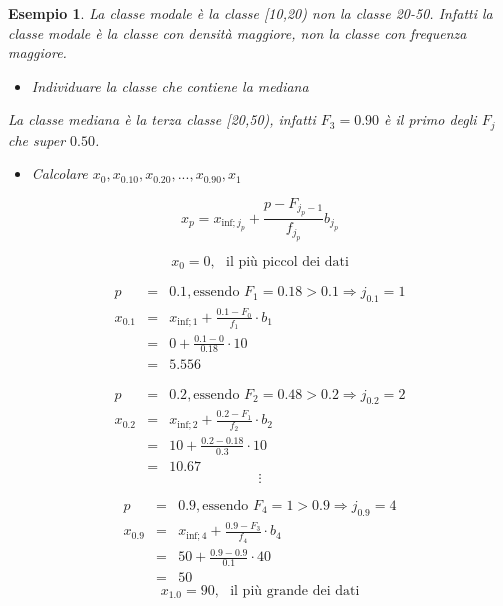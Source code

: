 \documentclass[
  11pt,
]{book}
\providecommand{\tightlist}{%
  \setlength{\itemsep}{0pt}\setlength{\parskip}{0pt}}
\theoremstyle{mytheoremstyle}
\theoremstyle{mydefstyle}
\newtheorem{example}{{Esempio}}[section]
\begin{document}
\begin{example}
La classe modale è la classe {[}10,20) non la classe 20-50. Infatti la classe modale è la classe con densità maggiore, non la classe con frequenza maggiore.

\begin{itemize}
\tightlist
\item
  Individuare la classe che contiene la mediana
\end{itemize}

La classe mediana è la terza classe {[}20,50), infatti \(F_3=0.90\) è il primo degli \(F_j\) che
super \(0.50\).

\begin{itemize}
\tightlist
\item
  Calcolare \(x_0, x_{0.10}, x_{0.20},..., x_{0.90}, x_1\)
\end{itemize}

\[x_p           = x_{\text{inf};j_p} + \frac {p - F_{j_p - 1}} {f_{j_p}} b_{j_p}\]

\[x_0 = 0, ~~~\text{il più piccol dei dati}\]

\begin{eqnarray*}
  p &=&  0.1 , \text{essendo }F_{ 1 }= 0.18  > 0.1  \Rightarrow j_{ 0.1 }= 1 \\
  x_{ 0.1 } &=& x_{\text{inf}; 1 } + \frac{ { 0.1 } - F_{ 0 }} {f_{ 1 }} \cdot b_{ 1 } \\
            &=&  0  + \frac {{ 0.1 } -  0 } { 0.18 } \cdot  10  \\
            &=&  5.556 
\end{eqnarray*}

\begin{eqnarray*}
  p &=&  0.2 , \text{essendo }F_{ 2 }= 0.48  > 0.2  \Rightarrow j_{ 0.2 }= 2 \\
  x_{ 0.2 } &=& x_{\text{inf}; 2 } + \frac{ { 0.2 } - F_{ 1 }} {f_{ 2 }} \cdot b_{ 2 } \\
            &=&  10  + \frac {{ 0.2 } -  0.18 } { 0.3 } \cdot  10  \\
            &=&  10.67 
\end{eqnarray*}
\[\vdots\]

\begin{eqnarray*}
  p &=&  0.9 , \text{essendo }F_{ 4 }= 1  > 0.9  \Rightarrow j_{ 0.9 }= 4 \\
  x_{ 0.9 } &=& x_{\text{inf}; 4 } + \frac{ { 0.9 } - F_{ 3 }} {f_{ 4 }} \cdot b_{ 4 } \\
            &=&  50  + \frac {{ 0.9 } -  0.9 } { 0.1 } \cdot  40  \\
            &=&  50 
\end{eqnarray*}
\[x_{1.0} = 90, ~~~\text{il più grande dei dati}\]


\end{example}
\end{document}
